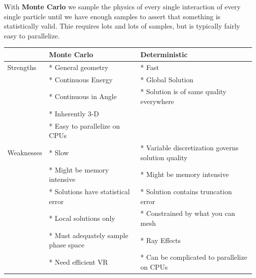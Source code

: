 \documentclass[12pt]{article}
\begin{document}
With \textbf{Monte Carlo} we sample the physics of every single interaction of every single particle until we have enough samples to assert that something is statistically valid. Thie requires lots and lots of samples, but is typically fairly easy to parallelize.

\begin{center}
\begin{tabu}{| l | X | X |}
  \hline
  & Monte Carlo         & Deterministic \\\hline
    Strengths & * General geometry    & * Fast \\
              & * Continuous Energy   & * Global Solution\\
              & * Continuous in Angle & * Solution is of same quality everywhere\\
              & * Inherently 3-D      & \\
              & * Easy to parallelize on CPUs & \\\hline
    Weaknesses & * Slow & * Variable discretization governs solution quality \\
               & * Might be memory intensive & * Might be memory intensive \\
               & * Solutions have statistical error & * Solution contains truncation error\\
               & * Local solutions only & * Constrained by what you can mesh \\
               & * Must adequately sample phase space & * Ray Effects \\
               & * Need efficient VR & * Can be complicated to parallelize on CPUs \\\hline
  \end{tabu}
\end{center}
\end{document}
